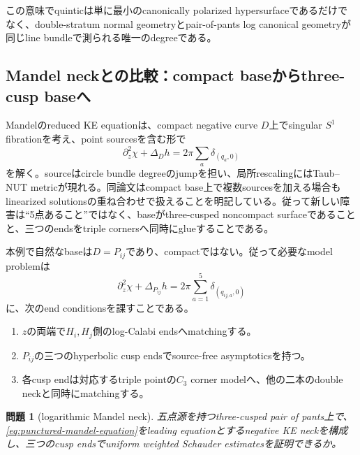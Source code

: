 \documentclass[11pt,a4paper]{ltjsarticle}
\newtheorem{question}[theorem]{問題}
\theoremstyle{definition}
\theoremstyle{remark}
\begin{document}
この意味でquinticは単に最小のcanonically polarized hypersurfaceであるだけでなく、double-stratum normal geometryとpair-of-pants log canonical geometryが同じline bundleで測られる唯一のdegreeである。

\subsection{Mandel neckとの比較：compact baseからthree-cusp baseへ}

Mandelのreduced KE equationは、compact negative curve $D$上でsingular $S^1$ fibrationを考え、point sourcesを含む形で
\begin{equation}\label{eq:mandel-reduced}
 \partial_z^2\chi+\Delta_D h=2\pi\sum_a\delta_{(q_a,0)}
\end{equation}
を解く。sourceはcircle bundle degreeのjumpを担い、局所rescalingにはTaub--NUT metricが現れる\cite{Mandel}。同論文はcompact base上で複数sourcesを加える場合もlinearized solutionsの重ね合わせで扱えることを明記している。従って新しい障害は``5点あること''ではなく、baseがthree-cusped noncompact surfaceであることと、三つのendsをtriple cornersへ同時にglueすることである。

本例で自然なbaseは$D=P_{ij}$であり、compactではない。従って必要なmodel problemは
\begin{equation}\label{eq:punctured-mandel-equation}
 \partial_z^2\chi+\Delta_{P_{ij}}h
 =2\pi\sum_{a=1}^{5}\delta_{(q_{ij,a},0)}
\end{equation}
に、次のend conditionsを課すことである。
\begin{enumerate}[label=(E\arabic*),leftmargin=3em]
\item $z$の両端で$H_i,H_j$側のlog-Calabi endsへmatchingする。
\item $P_{ij}$の三つのhyperbolic cusp endsでsource-free asymptoticsを持つ。
\item 各cusp endは対応するtriple pointの$C_3$ corner modelへ、他の二本のdouble neckと同時にmatchingする。
\end{enumerate}

\begin{question}[logarithmic Mandel neck]\label{q:log-mandel}
五点源を持つthree-cusped pair of pants上で、\eqref{eq:punctured-mandel-equation}をleading equationとするnegative KE neckを構成し、三つのcusp endsでuniform weighted Schauder estimatesを証明できるか。
\end{question}
\end{document}
